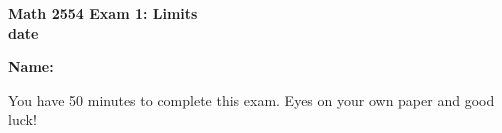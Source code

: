 \documentclass[11pt,letterpaper]{article}
\begin{document}
\flushleft
\begin{multicols}{2}

\begin{large}\textbf{Math 2554 Exam 1: Limits \\
date}\end{large}

\hfill\textbf{Name:  }\underline{\hspace{40ex}} %

\vspace{.5in}

\end{multicols}

\pagestyle{empty}

\flushleft

You have 50 minutes to complete this exam.  Eyes on your own paper and good luck!
\end{document}

